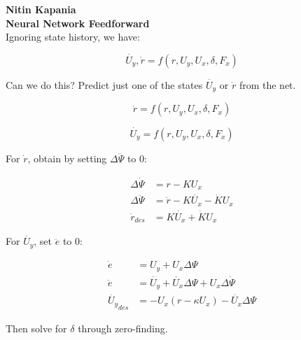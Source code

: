 \documentclass[11pt]{article}
\begin{document}
\textbf{Nitin Kapania} \\
\textbf{Neural Network Feedforward} \\

Ignoring state history, we have:

\begin{equation}
\dot{U_y}, \dot{r} = f(r, U_y, U_x, \delta, F_x)
\end{equation} 

Can we do this? Predict just one of the states $\dot{U_y}$ or $\dot{r}$ from the net. 


\begin{equation}
\dot{r} = f(r, U_y, U_x, \delta, F_x)
\end{equation} 

\begin{equation}
\dot{U_y} = f(r, U_y, U_x, \delta, F_x)
\end{equation} 

For $\dot{r}$, obtain by setting $\Delta \ddot{\Psi}$  to 0:

\begin{align}
\Delta \dot{\Psi} &= r - KU_x \\
\Delta \ddot{\Psi} &= \dot{r} - K\dot{U_x} - \dot{K}U_x \\
\dot{r}_{des} &= K\dot{U_x} + \dot{K}U_x
\end{align}

For $\dot{U_y}$, set $\ddot{e}$ to 0:

\begin{align}
\dot{e} &= U_y + U_x \Delta \Psi \\
\ddot{e} &= \dot{U_y} + \dot{U_x}\Delta\Psi + U_x\Delta\dot{\Psi}\\
\dot{U_y}_{des} &= - U_x(r-\kappa U_x) - \dot{U_x}\Delta\Psi
\end{align}

Then solve for $\delta$ through zero-finding. 
\end{document}
